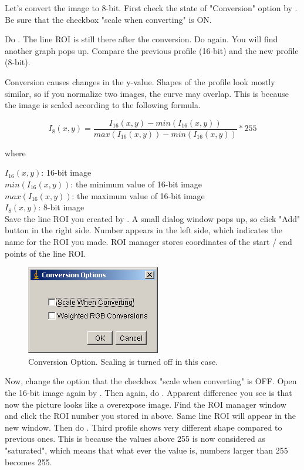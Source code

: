 \begin{indentexercise}{1}
Let's convert the image to 8-bit. First check the state
of "Conversion" option by
. Be
sure that the checkbox "scale when
converting" is ON. 



Do . The line
ROI is still there after the conversion. Do again. 
You will find another graph pops up. Compare the previous profile (16-bit) and the new profile (8-bit).

Conversion causes changes in the y-value. Shapes of the profile look
mostly similar, so if you normalize two images, the curve may overlap.
This is because the image is scaled according to the following
formula.

\[
I_{8}(x,y) = \frac{I_{16}(x, y) - min(I_{16}(x,y))}{ max(I_{16}(x,y)) -  min(I_{16}(x,y))} *255
\]

where

$I_{16}(x, y)$: 16-bit image\\
$min(I_{16}(x,y))$: the minimum value of 16-bit image\\
$max(I_{16}(x,y))$: the maximum value of 16-bit image\\
$I_{8}(x, y)$: 8-bit image\\


Save the line ROI you created by . A small dialog window pops up, so
click "Add" button in the right side.
Number appears in the left side, which indicates the name for the ROI
you made. ROI manager stores coordinates of the start / end points of
the line ROI.

\begin{figure}[htbp]
\begin{center}
\includegraphics[width=5.847cm,height=3.863cm]{fig/CMCIBasicCourse201102-img8.png}
\caption{Conversion Option. Scaling is turned off in this case. }
\label{fig:img8}
\end{center}
\end{figure}

Now, change the option  that the checkbox "scale when
converting" is OFF. Open the 16-bit image again by
. Then
again, do .
Apparent difference you see is that now the picture looks like a
overexpose image. Find the ROI manager window and click the ROI number
you stored in above. Same line ROI will appear in the new window. Then
do . Third profile
shows very different shape compared to previous ones. This is because
the values above 255 is now considered as
"saturated", which means that what ever the
value is, numbers larger than 255 becomes 255.


\end{indentexercise}
